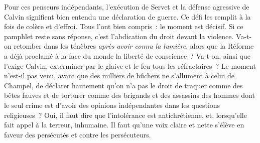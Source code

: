 \documentclass[french,twoside]{book} %
\begin{document}
Pour ces penseurs indépendants, l’exécution de Servet et la défense agressive de Calvin signifient bien entendu une déclaration de guerre. Ce défi les remplit à la fois de colère et d’effroi. Tous l’ont bien compris : le moment est décisif. Si ce pamphlet reste sans réponse, c’est l’abdication du droit devant la violence. Va-t-on retomber dans les ténèbres \emph{après avoir connu la lumière}, alors que la Réforme a déjà proclamé à la face du monde la liberté de conscience ? Va-t-on, ainsi que l’exige Calvin, exterminer par le glaive et le feu tous les réfractaires ? Le moment n’est-il pas venu, avant que des milliers de bûchers ne s’allument à celui de Champel, de déclarer hautement qu’on n’a pas le droit de traquer comme des bêtes fauves et de torturer comme des brigands et des assassins des hommes dont le seul crime est d’avoir des opinions indépendantes dans les questions religieuses ? Oui, il faut dire que l’intolérance est antichrétienne, et, lorsqu’elle fait appel à la terreur, inhumaine. Il faut qu’une voix claire et nette s’élève en faveur des persécutés et contre les persécuteurs.\par
\end{document}
